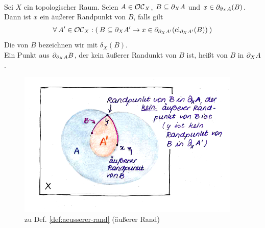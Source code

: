 %
% 
%
    \begin{dfn}\label{def:aeusserer-rand} \ \vspace{8pt}

        \noindent
        Sei $X$ ein topologischer Raum.
        Seien $A \in \mathcal{OC}_X$, $B \subseteq \partial_X A$ und $x \in \partial_{\partial_X A}(B)$. Dann ist $x$ ein äußerer Randpunkt von $B$, falls gilt
        \begin{align*}
            \forall\: A' \in \mathcal{OC}_X : (\: B \subseteq \partial_X A' \rightarrow x \in \partial_{\partial_X A'}(\text{cl}_{\partial_X A'}(B)) \:)
        \end{align*}
        Die  von $B$ bezeichnen wir mit $\delta_X(B)$.\\
        Ein Punkt aus $\partial_{\partial_X A} B$, der kein äußerer Randunkt von $B$ ist, heißt  von $B$ in $\partial_X A$.
    \end{dfn}
%
%
    \begin{figure}[ht]
        \centering
        \includegraphics[height=7cm]{abb/aeusserer-rand.png}
        \caption{zu Def. \ref{def:aeusserer-rand} (äußerer Rand)}
        \label{fig:aeus-rand}
    \end{figure}
